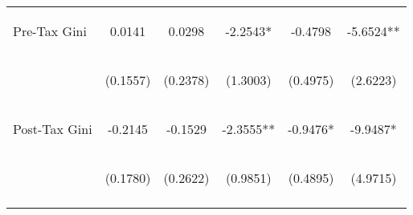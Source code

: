 \begin{center}
\begin{tabular}{lccccc}
\noalign{\smallskip}Pre-Tax Gini & \begin{scriptsize}0.0141\end{scriptsize} & \begin{scriptsize}0.0298\end{scriptsize} & \begin{scriptsize}-2.2543*\end{scriptsize} & \begin{scriptsize}-0.4798\end{scriptsize} & \begin{scriptsize}-5.6524**\end{scriptsize}\\
 & \begin{scriptsize}(0.1557)\end{scriptsize} & \begin{scriptsize}(0.2378)\end{scriptsize} & \begin{scriptsize}(1.3003)\end{scriptsize} & \begin{scriptsize}(0.4975)\end{scriptsize} & \begin{scriptsize}(2.6223)\end{scriptsize}\\
\noalign{\smallskip}Post-Tax Gini & \begin{scriptsize}-0.2145\end{scriptsize} & \begin{scriptsize}-0.1529\end{scriptsize} & \begin{scriptsize}-2.3555**\end{scriptsize} & \begin{scriptsize}-0.9476*\end{scriptsize} & \begin{scriptsize}-9.9487*\end{scriptsize}\\
 & \begin{scriptsize}(0.1780)\end{scriptsize} & \begin{scriptsize}(0.2622)\end{scriptsize} & \begin{scriptsize}(0.9851)\end{scriptsize} & \begin{scriptsize}(0.4895)\end{scriptsize} & \begin{scriptsize}(4.9715)\end{scriptsize}\\
\noalign{\smallskip}\hline\end{tabular}\\
\end{center}
